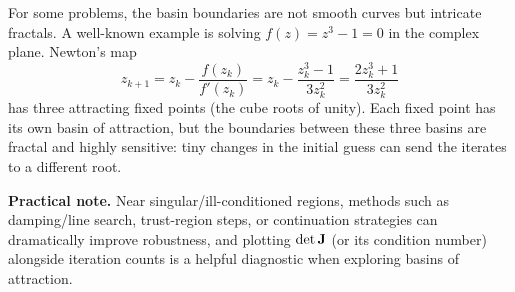 \begin{exampleBox}
\begin{center}
    \end{center}
\end{exampleBox}

For some problems, the basin boundaries are not smooth curves but intricate fractals. A well-known example is solving \(f(z)=z^3-1=0\) in the complex plane. Newton's map
\begin{equation}
z_{k+1}=z_k-\frac{f(z_k)}{f'(z_k)}=z_k-\frac{z_k^3-1}{3z_k^2}=\frac{2z_k^3+1}{3z_k^2}
\end{equation}
has three attracting fixed points (the cube roots of unity). Each fixed point has its own basin of attraction, but the boundaries between these three basins are fractal and highly sensitive: tiny changes in the initial guess can send the iterates to a different root.


\textbf{Practical note.} Near singular/ill-conditioned regions, methods such as damping/line search, trust-region steps, or continuation strategies can dramatically improve robustness, and plotting \(\det\mathbf{J}\) (or its condition number) alongside iteration counts is a helpful diagnostic when exploring basins of attraction.


